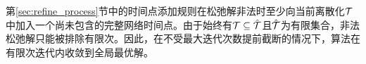 \begin{theorem}
\label{thm:refine_converge}
第\ref{sec:refine_process}节中的时间点添加规则在松弛解非法时至少向当前离散化$\mathcal{T}$中加入一个尚未包含的完整网络时间点。由于始终有$\mathcal{T}\subseteq\hat{\mathcal{T}}$且$\hat{\mathcal{T}}$为有限集合，非法松弛解只能被排除有限次。因此，在不受最大迭代次数提前截断的情况下，算法在有限次迭代内收敛到全局最优解。
\end{theorem}
